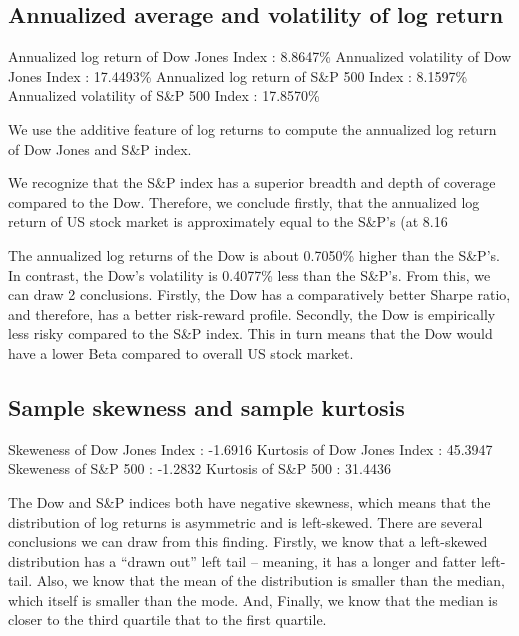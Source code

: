 \documentclass[a4paper]{article}
\begin{document}
\subsection{Annualized average and volatility of log return}
\begin{flushleft}
Annualized log return of Dow Jones Index : 8.8647\% \linebreak 
Annualized volatility of Dow Jones Index : 17.4493\% \linebreak 
Annualized log return of S\&P 500 Index : 8.1597\% \linebreak 
Annualized volatility of S\&P 500 Index : 17.8570\% \linebreak 
\end{flushleft}
\vspace{-5mm}
We use the additive feature of log returns to compute the annualized log return of Dow Jones and S\&P index. 

We recognize that the S\&P index has a superior breadth and depth of coverage compared to the Dow. Therefore, we conclude firstly, that the annualized log return of US stock market is approximately equal to the S\&P’s (at 8.16%

The annualized log returns of the Dow is about 0.7050\% higher than the S\&P’s. In contrast, the Dow’s volatility is 0.4077\% less than the S\&P’s. From this, we can draw 2 conclusions. Firstly, the Dow has a comparatively better Sharpe ratio, and therefore, has a better risk-reward profile. Secondly, the Dow is empirically less risky compared to the S\&P index. This in turn means that the Dow would have a lower Beta compared to overall US stock market.


\subsection{Sample skewness and sample kurtosis}
\begin{flushleft}
Skeweness of Dow Jones Index : -1.6916 \linebreak
Kurtosis of Dow Jones Index : 45.3947 \linebreak
Skeweness of S\&P 500 : -1.2832 \linebreak
Kurtosis of S\&P 500 : 31.4436 \linebreak
\end{flushleft}
\vspace{-5mm}
The Dow and S\&P indices both have negative skewness, which means that the distribution of log returns is asymmetric and is left-skewed. There are several conclusions we can draw from this finding. Firstly, we know that a left-skewed distribution has a “drawn out” left tail – meaning, it has a longer and fatter left-tail. Also, we know that the mean of the distribution is smaller than the median, which itself is smaller than the mode. And, Finally, we know that the median is closer to the third quartile that to the first quartile. 
\end{document}
